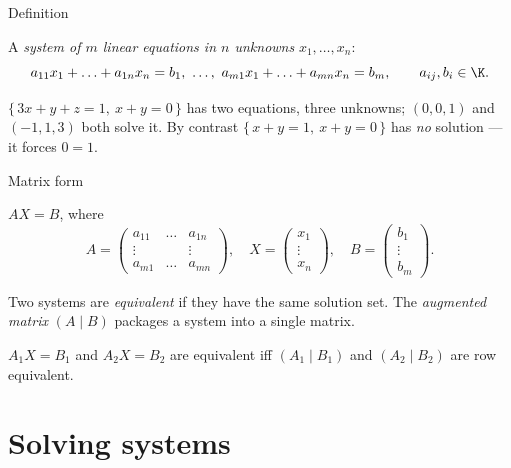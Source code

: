 \begin{frame}{Definition}
\begin{definition}
A \emph{system of $m$ linear equations in $n$ unknowns} $x_1,\ldots,x_n$:
\[
a_{11}x_1+\ldots+a_{1n}x_n = b_1, \ \ldots, \ a_{m1}x_1+\ldots+a_{mn}x_n=b_m, \qquad a_{ij},b_i\in\K.
\]
\end{definition}

\pause

\begin{example}
$\{\,3x+y+z=1,\ x+y=0\,\}$ has two equations, three unknowns; $(0,0,1)$ and $(-1,1,3)$ both solve it. By
contrast $\{\,x+y=1,\ x+y=0\,\}$ has \emph{no} solution — it forces $0=1$.
\end{example}
\end{frame}

\begin{frame}{Matrix form}
\begin{observation}
$AX=B$, where
\[
A = \left(\begin{smallmatrix} a_{11}&\ldots&a_{1n}\\ \vdots&&\vdots\\ a_{m1}&\ldots&a_{mn}\end{smallmatrix}\right), \quad
X = \left(\begin{smallmatrix} x_1\\ \vdots\\ x_n\end{smallmatrix}\right), \quad
B = \left(\begin{smallmatrix} b_1\\ \vdots\\ b_m\end{smallmatrix}\right).
\]
\end{observation}

\pause

\begin{definition}
Two systems are \emph{equivalent} if they have the same solution set. The \emph{augmented matrix}
$(A\mid B)$ packages a system into a single matrix.
\end{definition}

\pause

\begin{theorem}
$A_1X=B_1$ and $A_2X=B_2$ are equivalent iff $(A_1\mid B_1)$ and $(A_2\mid B_2)$ are row equivalent.
\end{theorem}
\end{frame}

\section{Solving systems}

